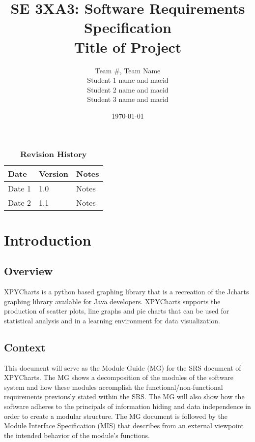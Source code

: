 \documentclass[12pt, titlepage]{article}
\title{SE 3XA3: Software Requirements Specification\\Title of Project}
\author{Team \#, Team Name
		\\ Student 1 name and macid
		\\ Student 2 name and macid
		\\ Student 3 name and macid
}
\date{\today}
\begin{document}
\maketitle

\tableofcontents
\listoftables
\listoffigures

\begin{table}[bp]
\caption{\bf Revision History}
\begin{tabularx}{\textwidth}{p{3cm}p{2cm}X}
\toprule {\bf Date} & {\bf Version} & {\bf Notes}\\
\midrule
Date 1 & 1.0 & Notes\\
Date 2 & 1.1 & Notes\\
\bottomrule
\end{tabularx}
\end{table}

\newpage


\section{Introduction}
\subsection{Overview}
XPYCharts is a python based graphing library that is a recreation of the Jcharts graphing library available for Java developers. XPYCharts supports the production of scatter plots, line graphs and pie charts that can be used for statistical analysis and in a learning environment for data visualization.
\subsection{Context}
This document will serve as the Module Guide (MG) for the SRS document of XPYCharts. The MG shows a decomposition of the modules of the software system and how these modules accomplish the functional/non-functional requirements previously stated within the SRS. The MG will also show how the software adheres to the principals of information hiding and data independence in order to create a modular structure. The MG document is followed by the Module Interface Specification (MIS) that describes from an external viewpoint the intended behavior of the module’s functions. 
\end{document}
